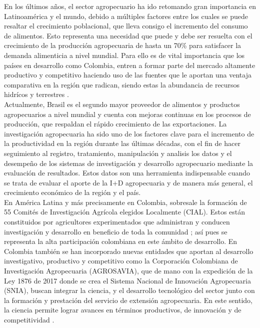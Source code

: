 
En los últimos años, el sector agropecuario ha ido retomando gran importancia en Latinoamérica y el mundo, debido a múltiples factores entre los cuales se puede resaltar el crecimiento poblacional, que lleva consigo el incremento del consumo de alimentos. Esto representa una necesidad que puede y debe ser resuelta con el crecimiento de la producción agropecuaria de hasta un 70\% para satisfacer la demanda alimenticia a nivel mundial. Para ello es de vital importancia que los países en desarrollo como Colombia, entren a formar parte del mercado altamente productivo y competitivo haciendo uso de las fuentes que le aportan una ventaja comparativa en la región que radican, siendo estas la abundancia de recursos hidrícos y terrestres \cite{fao}.\\

Actualmente, Brasil es el segundo mayor proveedor de alimentos y productos agropecuarios a nivel mundial y cuenta con mejoras continuas en los procesos de producción, que respaldan el rápido crecimiento de las exportaciones. La investigación agropecuaria ha sido uno de los factores clave para el incremento de la productividad en la región durante las últimas décadas, con el fin de hacer seguimiento al registro, tratamiento, manipulación y analisis  los datos y el desempeño de los sistemas de investigación y desarrollo agropecuario mediante la evaluación de resultados. Estos datos son una herramienta indispensable cuando se trata de evaluar el aporte de la I+D agropecuaria y de manera más general, el crecimiento económico de la región y el país.\\

En América Latina y más precisamente en Colombia, sobresale la formación de 55 Comités de Investigación Agrícola elegidos Localmente (CIAL). Estos están constituidos por agricultores experimentados que administran y conducen investigación y desarrollo en beneficio de toda la comunidad \cite{ashby}; así pues se representa la alta participación colombiana en este ámbito de desarrollo. En Colombia también se han incorporado nuevas entidades que aportan al desarrollo investigativo, productivo y competitivo como la Corporación Colombiana de Investigación Agropecuaria (AGROSAVIA), que de mano con la expedición de la Ley 1876 de 2017 donde se crea el Sistema Nacional de Innovación Agropecuaria (SNIA), buscan integrar la ciencia, y el desarrollo tecnológico del sector junto con la formación y prestación del servicio de extensión agropecuaria. En este sentido, la ciencia permite lograr avances en términos productivos, de innovación y de competitividad \cite{minagricultura}.\\

